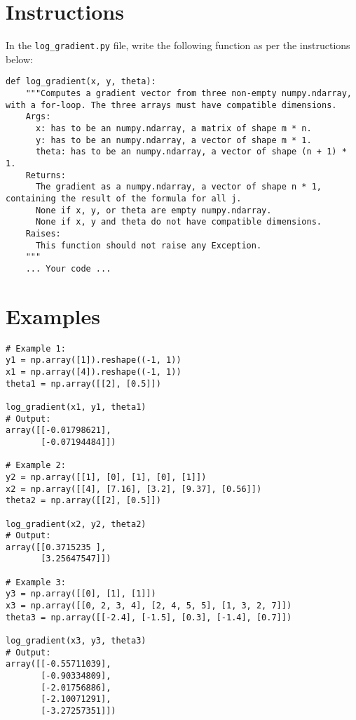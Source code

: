 \section*{Instructions}
In the \texttt{log\_gradient.py} file, write the following function as per the instructions below:\\

\begin{verbatim}
def log_gradient(x, y, theta):
    """Computes a gradient vector from three non-empty numpy.ndarray, with a for-loop. The three arrays must have compatible dimensions.
    Args:
      x: has to be an numpy.ndarray, a matrix of shape m * n.
      y: has to be an numpy.ndarray, a vector of shape m * 1.
      theta: has to be an numpy.ndarray, a vector of shape (n + 1) * 1.
    Returns:
      The gradient as a numpy.ndarray, a vector of shape n * 1, containing the result of the formula for all j.
      None if x, y, or theta are empty numpy.ndarray.
      None if x, y and theta do not have compatible dimensions.
    Raises:
      This function should not raise any Exception.
    """
    ... Your code ...
\end{verbatim}

\section*{Examples}
\begin{verbatim}
# Example 1:
y1 = np.array([1]).reshape((-1, 1))
x1 = np.array([4]).reshape((-1, 1))
theta1 = np.array([[2], [0.5]])

log_gradient(x1, y1, theta1)
# Output:
array([[-0.01798621],
       [-0.07194484]])

# Example 2: 
y2 = np.array([[1], [0], [1], [0], [1]])
x2 = np.array([[4], [7.16], [3.2], [9.37], [0.56]])
theta2 = np.array([[2], [0.5]])

log_gradient(x2, y2, theta2)
# Output:
array([[0.3715235 ],
       [3.25647547]])

# Example 3: 
y3 = np.array([[0], [1], [1]])
x3 = np.array([[0, 2, 3, 4], [2, 4, 5, 5], [1, 3, 2, 7]])
theta3 = np.array([[-2.4], [-1.5], [0.3], [-1.4], [0.7]])

log_gradient(x3, y3, theta3)
# Output:
array([[-0.55711039],
       [-0.90334809],
       [-2.01756886],
       [-2.10071291],
       [-3.27257351]])
\end{verbatim}